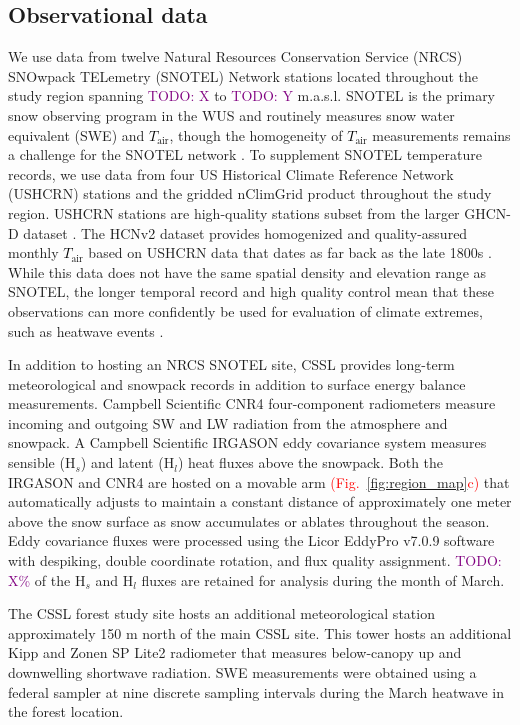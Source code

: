 \documentclass[draft]{agujournal2019}
\newcommand{\fig}[2]{\textcolor{red}{(Fig.~\ref{#1}{#2})}}   %
\newcommand{\todo}[1]{\textcolor{purple}{TODO: #1}}      %
\newcommand{\tair}{\textcolor{black}{$T_{\mathrm{air}}$}\xspace}
\begin{document}
\subsection{Observational data}
We use data from twelve Natural Resources Conservation Service (NRCS) SNOwpack TELemetry (SNOTEL) Network stations located throughout the study region spanning \todo{X} to \todo{Y} m.a.s.l.
SNOTEL is the primary snow observing program in the WUS \cite{Serreze1999-as} and routinely measures snow water equivalent (SWE) and \tair, though the homogeneity of \tair measurements remains a challenge for the SNOTEL network \cite{Oyler2015-by, McAfee2019-mt}.
To supplement SNOTEL temperature records, we use data from four US Historical Climate Reference Network (USHCRN) stations and the gridded nClimGrid product throughout the study region.
USHCRN stations are high-quality stations subset from the larger GHCN-D dataset .
The HCNv2 dataset provides homogenized and quality-assured monthly \tair based on USHCRN data that dates as far back as the  late 1800s \cite{Menne2009-ushcn}.
While this data does not have the same spatial density and elevation range as SNOTEL, the longer temporal record and high quality control mean that these observations can more confidently be used for evaluation of climate extremes, such as heatwave events \cite{BercosHickey2022}.

In addition to hosting an NRCS SNOTEL site, CSSL provides long-term meteorological and snowpack records in addition to surface energy balance measurements.
Campbell Scientific CNR4 four-component radiometers measure incoming and outgoing SW and LW radiation from the atmosphere and snowpack.
A Campbell Scientific IRGASON eddy covariance system measures sensible (H$_s$) and latent (H$_l$) heat fluxes above the snowpack.
Both the IRGASON and CNR4 are hosted on a movable arm \fig{fig:region_map}{c} that automatically adjusts to maintain a constant distance of approximately one meter above the snow surface as snow accumulates or ablates throughout the season.
Eddy covariance fluxes were processed using the Licor EddyPro v7.0.9 software with despiking, double coordinate rotation, and flux quality assignment.
\todo{X\%} of the H$_s$ and H$_l$ fluxes are retained for analysis during the month of March.

The CSSL forest study site hosts an additional meteorological station approximately 150 m north of the main CSSL site.
This tower hosts an additional Kipp and Zonen SP Lite2 radiometer that measures below-canopy up and downwelling shortwave radiation.
SWE measurements were obtained using a federal sampler \cite{Osterhuber2014-ic} at nine discrete sampling intervals during the March heatwave in the forest location.
\end{document}
